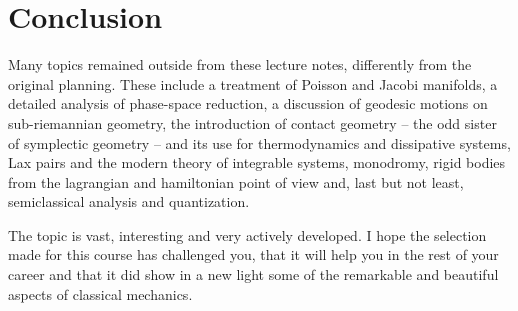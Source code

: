 \documentclass[english,fontsize=11pt,paper=b5]{scrbook}
\theoremstyle{definition}
\begin{document}
      \chapter{Conclusion}

      Many topics remained outside from these lecture notes, differently from the original planning.
      These include a treatment of Poisson and Jacobi manifolds, a detailed analysis of phase-space reduction, a discussion of geodesic motions on sub-riemannian geometry, the introduction of contact geometry -- the odd sister of symplectic geometry -- and its use for thermodynamics and dissipative systems, Lax pairs and the modern theory of integrable systems, monodromy, rigid bodies from the lagrangian and hamiltonian point of view and, last but not least, semiclassical analysis and quantization.

      The topic is vast, interesting and very actively developed. I hope the selection made for this course has challenged you, that it will help you in the rest of your career and that it did show in a new light some of the remarkable and beautiful aspects of classical mechanics.






\end{document}
